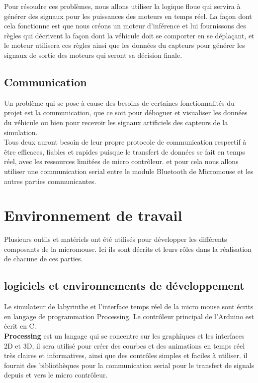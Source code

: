 Pour résoudre ces problèmes, nous allons utiliser la logique floue qui servira
à générer des signaux pour les puissances des moteurs en temps réel. La façon
dont cela fonctionne est que nous créons un moteur d'inférence et lui
fournissons des règles qui décrivent la façon dont la véhicule doit se comporter 
en se déplaçant, et le moteur utilisera ces règles ainsi que les données du
capteurs pour générer les signaux de sortie des moteurs qui seront sa décision
finale.

\subsection{Communication} \label{sec:mapMaze}
Un problème qui se pose à cause des besoins de certaines fonctionnalités du
projet est la communication, que ce soit pour déboguer et visualiser les
données du véhicule ou bien pour recevoir les signaux artificiels des capteurs
de la simulation. \\

Tous deux auront besoin de leur propre protocole de communication respectif
à être efficaces, fiables et rapides puisque le transfert de données se fait en
temps réel, avec les ressources limitées de micro contrôleur. et pour cela nous
allons utiliser une communication serial entre le module Bluetooth de Micromouse
et les autres parties communicantes.

\section{Environnement de travail} \label{sec:environnement}
   Plusieurs outils et matériels ont été utilisés pour développer les
différents composants de la micromouse. Ici ils sont décrits et leurs rôles
dans la réalisation de chacune de ces parties.

\subsection{logiciels et environnements de développement} \label{subsec:softDev} 

   Le simulateur de labyrinthe et l'interface temps réel de la micro mouse sont
écrits en langage de programmation Processing. Le contrôleur principal de
l'Arduino est écrit en C. \\


   \textbf{Processing} est un langage qui se concentre sur les graphiques et
les interfaces 2D et 3D, il sera utilisé pour créer des courbes et des
animations en temps réel très claires et informatives, ainsi que des
contrôles simples et faciles à utiliser. il fournit des bibliothèques pour
la communication serial pour le transfert de signals depuis et vers le micro
contrôleur. \\

